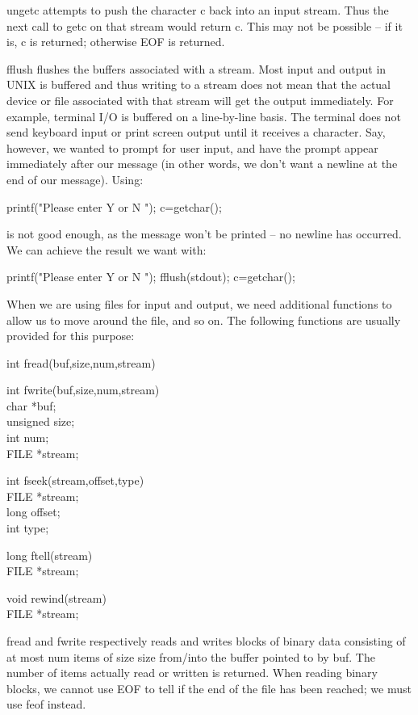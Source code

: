      {\cd ungetc} attempts  to push  the character {\cd c} back into
an input stream. Thus the next  call to {\cd getc} on that stream
would return {\cd c}. This may not be possible -- if it is, {\cd c}
is returned; otherwise {\cd EOF} is returned.

     {\cd fflush} flushes the buffers associated with a stream. Most
input and output in UNIX  is buffered and thus writing  to a  stream
does  not mean  that  the  actual  device  or  file associated with
that stream  will get  the output  immediately. For  example,
terminal I/O  is buffered  on a line-by-line basis. The terminal does
not send keyboard input  or print  screen output until it receives a
character.  Say, however,  we wanted  to prompt for user input, and
have the prompt appear immediately after  our message (in other
words, we don't want a newline at the end of our message).  Using:
\begin{code}
printf("Please enter Y or N "); c=getchar();
\end{code}
\noindent
     is not  good enough,  as the  message won't  be printed -- no
newline has occurred. We can achieve the result we want with:
\begin{code}
printf("Please enter Y or N "); fflush(stdout); c=getchar();
\end{code}
\noindent
     When we  are using  files  for  input  and  output,  we  need
additional functions to  allow us  to move  around the  file, and  so
on.  The  following functions are usually provided for this purpose:
\begin{code}
       int fread(buf,size,num,stream)	      \addVspace

       int fwrite(buf,size,num,stream)	      \\
       char *buf;			      \\
       unsigned size;			      \\
       int num;				      \\
       FILE *stream;			      \addVspace

       int fseek(stream,offset,type)	     \\
       FILE *stream;			     \\
       long offset;			     \\
       int type;			     \addVspace

       long ftell(stream)		     \\
       FILE *stream;			     \addVspace

       void rewind(stream)		     \\
       FILE *stream;
\end{code}
\noindent
     {\cd fread} and  {\cd fwrite} respectively reads  and writes
blocks of binary data consisting of at most {\cd num}  items of  size
{\cd size}  from/into the buffer pointed to by {\cd buf}.
The number of items actually read or written is returned.  When
reading binary blocks, we cannot use {\cd EOF} to tell if the end of
the file has been reached; we must use {\cd feof} instead.

